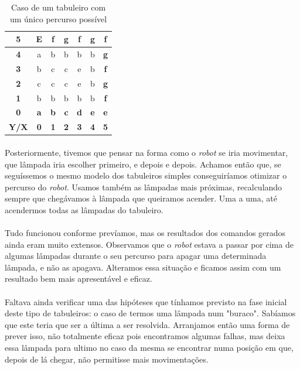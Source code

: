 \documentclass[a4paper,12pt]{article}
\begin{document}
\begin{table}[h]
\centering
\begin{tabular}{|c|c|c|c|c|c|c|}
\hline
\textbf{5} & \textbf{E} & \textbf{f} & \textbf{g} & \textbf{f} & \textbf{g} & \textbf{f} \\ \hline
\textbf{4} & a & b & b & b & b & \textbf{g} \\ \hline
\textbf{3} & b & c & c & e & b & \textbf{f} \\ \hline
\textbf{2} & c & c & c & e & b & \textbf{g} \\ \hline
\textbf{1} & b & b & b & b & b & \textbf{f} \\ \hline
\textbf{0} & \textbf{a} & \textbf{b} & \textbf{c} & \textbf{d} & \textbf{e} & \textbf{e} \\ \hline
\textbf{Y/X} & \textbf{0} & \textbf{1} & \textbf{2} & \textbf{3} & \textbf{4} & \textbf{5} \\ \hline
\end{tabular}
\caption{Caso de um tabuleiro com um único percurso possível} \label{Tab:Exemplo}
\end{table}

\paragraph{}

Posteriormente, tivemos que pensar na forma como o \emph{robot} se iria movimentar, que lâmpada iria escolher primeiro, e depois e depois. Achamos então que, se seguíssemos o mesmo modelo dos tabuleiros simples conseguiríamos otimizar o percurso do \emph{robot}. Usamos também as lâmpadas mais próximas, recalculando sempre que chegávamos à lâmpada que queiramos acender. Uma a uma, até acendermos todas as lâmpadas do tabuleiro.
\paragraph{}
Tudo funcionou conforme prevíamos, mas os resultados dos comandos gerados ainda eram muito extensos. Observamos que o \emph{robot} estava a passar por cima de algumas lâmpadas durante o seu percurso para apagar uma determinada lâmpada, e não as apagava. Alteramos essa situação e ficamos assim com um resultado bem mais apresentável e eficaz.
\paragraph{}
Faltava ainda verificar uma das hipóteses que tínhamos previsto na fase inicial deste tipo de tabuleiros: o caso de termos uma lâmpada num "buraco". Sabíamos que este teria que ser a última a ser resolvida. Arranjamos então uma forma de prever isso, não totalmente eficaz pois encontramos algumas falhas, mas deixa essa lâmpada para ultimo no caso da mesma se encontrar numa posição em que, depois de lá chegar, não permitisse mais movimentações.
\end{document}
